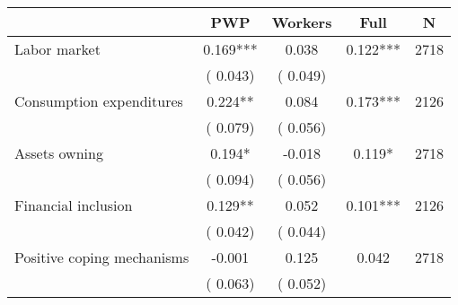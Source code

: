 
\begin{tabular}{l*{4}{c}}\hline&\multicolumn{1}{c}{PWP}&\multicolumn{1}{c}{Workers}&\multicolumn{1}{c}{Full}&\multicolumn{1}{c}{N} \\ \hline

 Labor market                       &              0.169*** &         0.038            &              0.122***     & 2718                             \\  
                                       &          (       0.043)               &        (       0.049)                                &                                               &                                               \\      

 Consumption expenditures                       &              0.224** &         0.084            &              0.173***     & 2126                             \\  
                                       &          (       0.079)               &        (       0.056)                                &                                               &                                               \\      

 Assets owning                       &              0.194* &        -0.018            &              0.119*     & 2718                             \\  
                                       &          (       0.094)               &        (       0.056)                                &                                               &                                               \\      

 Financial inclusion                       &              0.129** &         0.052            &              0.101***     & 2126                             \\  
                                       &          (       0.042)               &        (       0.044)                                &                                               &                                               \\      

 Positive coping mechanisms                       &             -0.001 &         0.125            &              0.042     & 2718                             \\  
                                       &          (       0.063)               &        (       0.052)                                &                                               &                                               \\      


\end{tabular}
